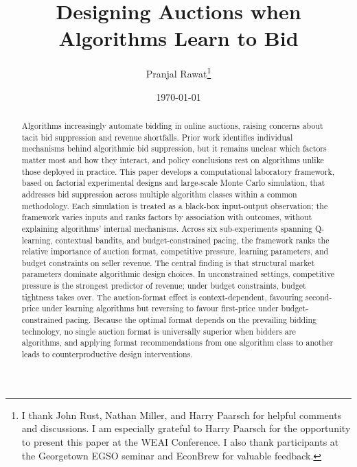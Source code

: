 \documentclass[11pt,notitlepage,a4paper]{article}
\title{Designing Auctions when Algorithms Learn to Bid}
\author{Pranjal Rawat\thanks{I thank John Rust, Nathan Miller, and Harry Paarsch for helpful comments and discussions. I am especially grateful to Harry Paarsch for the opportunity to present this paper at the WEAI Conference. I also thank participants at the Georgetown EGSO seminar and EconBrew for valuable feedback.}}
\date{\today}
\begin{document}
\maketitle

\begin{abstract}
Algorithms increasingly automate bidding in online auctions, raising concerns about tacit bid suppression and revenue shortfalls. Prior work identifies individual mechanisms behind algorithmic bid suppression, but it remains unclear which factors matter most and how they interact, and policy conclusions rest on algorithms unlike those deployed in practice. This paper develops a computational laboratory framework, based on factorial experimental designs and large-scale Monte Carlo simulation, that addresses bid suppression across multiple algorithm classes within a common methodology. Each simulation is treated as a black-box input-output observation; the framework varies inputs and ranks factors by association with outcomes, without explaining algorithms' internal mechanisms. Across six sub-experiments spanning Q-learning, contextual bandits, and budget-constrained pacing, the framework ranks the relative importance of auction format, competitive pressure, learning parameters, and budget constraints on seller revenue. The central finding is that structural market parameters dominate algorithmic design choices. In unconstrained settings, competitive pressure is the strongest predictor of revenue; under budget constraints, budget tightness takes over. The auction-format effect is context-dependent, favouring second-price under learning algorithms but reversing to favour first-price under budget-constrained pacing. Because the optimal format depends on the prevailing bidding technology, no single auction format is universally superior when bidders are algorithms, and applying format recommendations from one algorithm class to another leads to counterproductive design interventions.
\end{abstract}

\newpage
\tableofcontents
\newpage













\appendix


\end{document}

